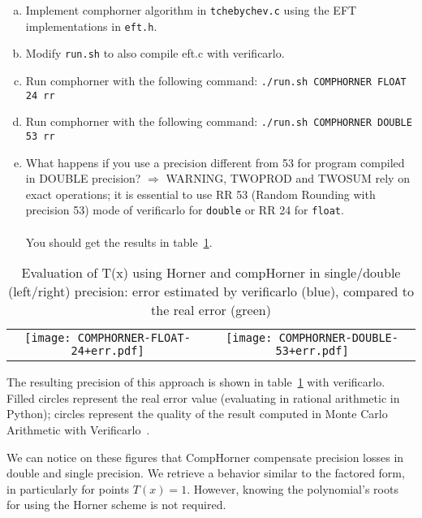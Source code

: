 \begin{question}
  \begin{enumerate}[(a)]
    \item Implement comphorner algorithm in {\tt tchebychev.c} using the EFT implementations in {\tt eft.h}.
    \item Modify {\tt run.sh} to also compile eft.c with verificarlo.
    \item Run comphorner with the following command: {\tt ./run.sh COMPHORNER FLOAT 24 rr}
    \item Run comphorner with the following command: {\tt ./run.sh COMPHORNER DOUBLE 53 rr}
    \item What happens if you use a precision different from 53 for program compiled in DOUBLE precision?
          $\Rightarrow$ WARNING, {\sc TWOPROD} and {\sc TWOSUM} rely on exact operations; it is essential to use RR 53 (Random Rounding with precision 53) mode of verificarlo for  \texttt{double} or RR 24 for \texttt{float}.
          \\~\\
          You should get the results in table~\ref{fig:comphornerVerificarlo24_53}.

  \end{enumerate}
\end{question}


\begin{table}
  \begin{tabular}{cc}
    \texttt{[image: COMPHORNER-FLOAT-24+err.pdf]} &
    \texttt{[image: COMPHORNER-DOUBLE-53+err.pdf]}  \\
  \end{tabular}
  \caption{Evaluation of T(x) using Horner and compHorner in single/double (left/right) precision: error estimated by verificarlo (blue), compared to the real error (green)}
  \label{fig:comphornerVerificarlo24_53}
\end{table}


The resulting precision of this approach is shown in table~\ref{fig:comphornerVerificarlo24_53} with verificarlo.
Filled circles represent the real error value (evaluating in rational arithmetic in Python); circles represent the quality of the result computed in Monte Carlo Arithmetic with Verificarlo~\cite{verrou}.

We can notice on these figures that CompHorner compensate precision losses in double and single precision. We retrieve a behavior similar to the factored form, in particularly for points $T(x)=1$. However, knowing the polynomial's roots for using the Horner scheme is not required.

